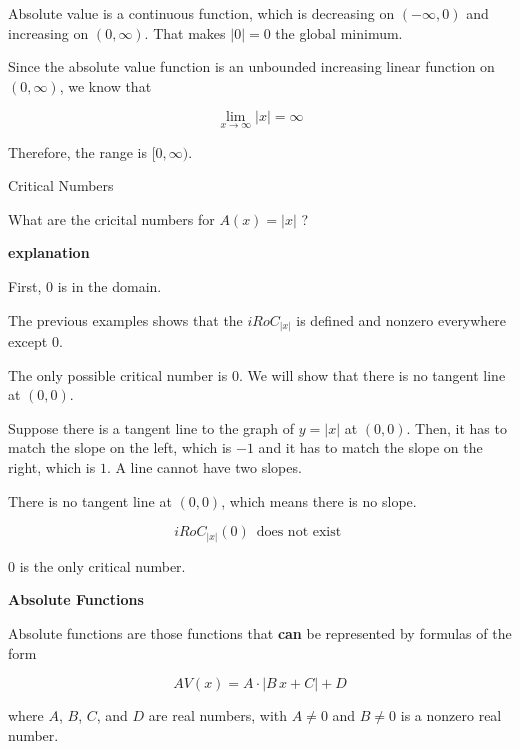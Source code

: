\documentclass{ximera}
\begin{document}
Absolute value is a continuous function, which is decreasing on $(-\infty, 0)$ and increasing on $(0, \infty)$. That makes $| 0 | = 0$ the global minimum. 


Since the absolute value function is an unbounded increasing linear function on $(0, \infty)$, we know that

\[
\lim\limits_{x \to \infty}| x | = \infty
\]



Therefore, the range is $[0, \infty)$.








\begin{example}  Critical Numbers


What are the cricital numbers for $A(x) = | x |$ ?



\textbf{\textcolor{red!75!green}{explanation}} 


First, $0$ is in the domain. 

The previous examples shows that the $iRoC_{|x|}$ is defined and nonzero everywhere except $0$. 

The only possible critical number is $0$.  We will show that there is no tangent line at $(0,0)$. 


Suppose there is a tangent line to the graph of $y = | x |$ at $(0,0)$.  Then, it has to match the slope on the left, which is $-1$ and it has to match the slope on the right, which is $1$.  A line cannot have two slopes. 


There is no tangent line at $(0,0)$, which means there is no slope. 



\[
iRoC_{|x|}(0) \, \text{ does not exist }
\]


$0$ is the only critical number.






\end{example}








\begin{definition} \textbf{\textcolor{green!50!black}{Absolute Functions}}

Absolute functions are those functions that \textbf{\textcolor{purple!85!blue}{can}} be represented by formulas of the form


\[      AV(x) = A \cdot | B \, x + C| + D   \]

where $A$, $B$, $C$, and $D$ are real numbers, with $A \ne 0$ and $B \ne 0$ is a nonzero real number.


\end{definition}
\end{document}

